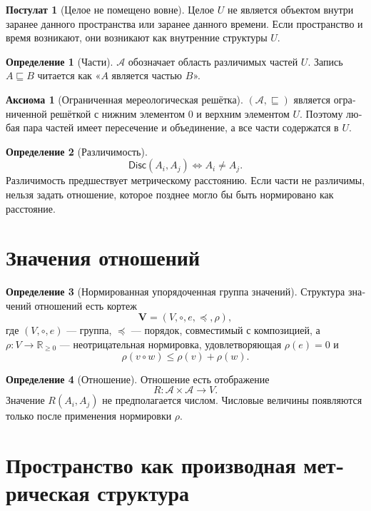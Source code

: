 \documentclass[11pt,a4paper]{article}
\theoremstyle{definition}
\newtheorem{definitionru}{Определение}[section]
\newtheorem{axiomru}{Аксиома}[section]
\newtheorem{postulateru}{Постулат}[section]
\theoremstyle{plain}
\theoremstyle{remark}
\newcommand{\Whole}{U}
\newcommand{\Parts}{\mathcal A}
\newcommand{\Rel}{R}
\newcommand{\Values}{V}
\newcommand{\Vstruct}{\mathbf V}
\newcommand{\PartOf}{\sqsubseteq}
\newcommand{\comp}{\circ}
\newcommand{\norm}{\rho}
\newcommand{\Disc}{\mathsf{Disc}}
\begin{document}
\begin{russian}
\begin{postulateru}[Целое не помещено вовне]
Целое \(\Whole\) не является объектом внутри заранее данного пространства или
заранее данного времени. Если пространство и время возникают, они возникают как
внутренние структуры \(\Whole\).
\end{postulateru}

\begin{definitionru}[Части]
\(\Parts\) обозначает область различимых частей \(\Whole\). Запись
\(A\PartOf B\) читается как «\(A\) является частью \(B\)».
\end{definitionru}

\begin{axiomru}[Ограниченная мереологическая решётка]
\((\Parts,\PartOf)\) является ограниченной решёткой с нижним элементом \(0\) и
верхним элементом \(\Whole\). Поэтому любая пара частей имеет пересечение и
объединение, а все части содержатся в \(\Whole\).
\end{axiomru}

\begin{definitionru}[Различимость]
\[
\Disc(A_i,A_j)\iff A_i\neq A_j.
\]
Различимость предшествует метрическому расстоянию. Если части не различимы,
нельзя задать отношение, которое позднее могло бы быть нормировано как
расстояние.
\end{definitionru}

\section{Значения отношений}

\begin{definitionru}[Нормированная упорядоченная группа значений]
Структура значений отношений есть кортеж
\[
\Vstruct=(\Values,\comp,e,\preceq,\norm),
\]
где \((\Values,\comp,e)\) — группа, \(\preceq\) — порядок, совместимый с
композицией, а \(\norm:\Values\to\mathbb R_{\ge0}\) — неотрицательная
нормировка, удовлетворяющая \(\norm(e)=0\) и
\[
\norm(v\comp w)\leq \norm(v)+\norm(w).
\]
\end{definitionru}

\begin{definitionru}[Отношение]
Отношение есть отображение
\[
\Rel:\Parts\times\Parts\to\Values.
\]
Значение \(\Rel(A_i,A_j)\) не предполагается числом. Числовые величины
появляются только после применения нормировки \(\norm\).
\end{definitionru}

\section{Пространство как производная метрическая структура}


\end{russian}
\end{document}
